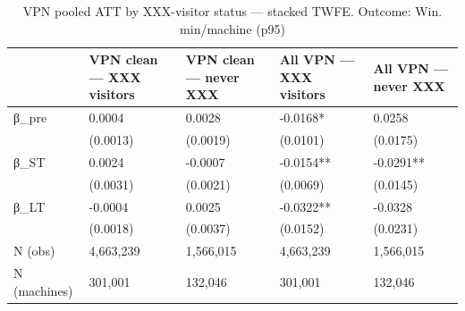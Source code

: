 \begin{table}

\caption{VPN pooled ATT by XXX-visitor status — stacked TWFE. Outcome: Win. min/machine (p95)}
\centering
\begin{tabular}[t]{lllll}
\toprule
  & VPN clean — XXX visitors & VPN clean — never XXX & All VPN — XXX visitors & All VPN — never XXX\\
\midrule
β\_pre & 0.0004 & 0.0028 & -0.0168* & 0.0258\\
 & (0.0013) & (0.0019) & (0.0101) & (0.0175)\\
β\_ST & 0.0024 & -0.0007 & -0.0154** & -0.0291**\\
 & (0.0031) & (0.0021) & (0.0069) & (0.0145)\\
β\_LT & -0.0004 & 0.0025 & -0.0322** & -0.0328\\
\addlinespace
 & (0.0018) & (0.0037) & (0.0152) & (0.0231)\\
N (obs) & 4,663,239 & 1,566,015 & 4,663,239 & 1,566,015\\
N (machines) & 301,001 & 132,046 & 301,001 & 132,046\\
\bottomrule
\end{tabular}
\end{table}
